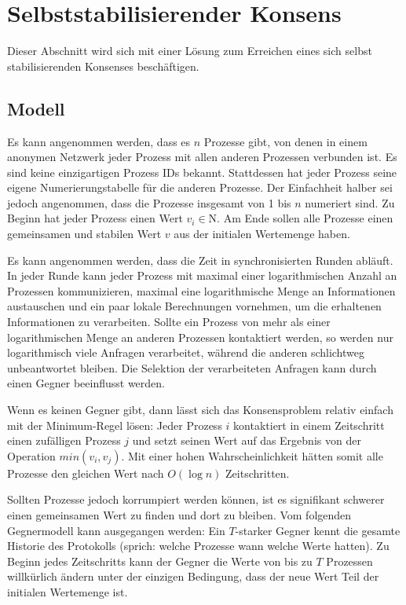 \documentclass[12pt,ngerman,a4paper]{scrartcl}
\theoremstyle{plain}
\theoremstyle{definition}
\theoremstyle{remark}
\begin{document}
\section{Selbststabilisierender Konsens}

Dieser Abschnitt wird sich mit einer Lösung zum Erreichen eines sich selbst
stabilisierenden Konsenses beschäftigen.
\subsection{Modell}

Es kann angenommen werden, dass es $n$ Prozesse gibt, von denen in einem anonymen
Netzwerk jeder Prozess mit allen anderen Prozessen verbunden ist. Es sind keine
einzigartigen Prozess IDs bekannt. Stattdessen hat jeder Prozess seine eigene
Numerierungstabelle für die anderen Prozesse. Der Einfachheit halber sei jedoch
angenommen, dass die Prozesse insgesamt von 1 bis $n$ numeriert sind. Zu Beginn
hat jeder Prozess einen Wert $v_i \in \mathrm{N}$. Am Ende sollen alle Prozesse
einen gemeinsamen und stabilen Wert $v$ aus der initialen Wertemenge haben.

Es kann angenommen werden, dass die Zeit in synchronisierten Runden abläuft.
In jeder Runde kann jeder Prozess mit maximal einer logarithmischen Anzahl an
Prozessen kommunizieren, maximal eine logarithmische Menge an Informationen
austauschen und ein paar lokale Berechnungen vornehmen, um die erhaltenen
Informationen zu verarbeiten. Sollte ein Prozess von mehr als einer logarithmischen
Menge an anderen Prozessen kontaktiert werden, so werden nur logarithmisch viele
Anfragen verarbeitet, während die anderen schlichtweg unbeantwortet bleiben.
Die Selektion der verarbeiteten Anfragen kann durch einen Gegner beeinflusst
werden.

Wenn es keinen Gegner gibt, dann lässt sich das Konsensproblem relativ einfach
mit der Minimum-Regel lösen: Jeder Prozess $i$ kontaktiert in einem Zeitschritt
einen zufälligen Prozess $j$ und setzt seinen Wert auf das Ergebnis von der
Operation $min(v_i, v_j)$. Mit einer hohen Wahrscheinlichkeit hätten somit alle
Prozesse den gleichen Wert nach $O(\log n)$ Zeitschritten.

Sollten Prozesse jedoch korrumpiert werden können, ist es signifikant schwerer
einen gemeinsamen Wert zu finden und dort zu bleiben. Vom folgenden Gegnermodell
kann ausgegangen werden: Ein $T$-starker Gegner kennt die gesamte Historie des
Protokolls (sprich: welche Prozesse wann welche Werte hatten). Zu Beginn jedes
Zeitschritts kann der Gegner die Werte von bis zu $T$ Prozessen willkürlich
ändern unter der einzigen Bedingung, dass der neue Wert Teil der initialen
Wertemenge ist.
\end{document}
